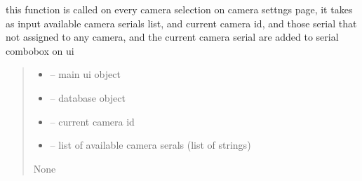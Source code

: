 \documentclass[letterpaper,10pt,english]{sphinxmanual}
\begin{document}

\begin{savenotes}\begin{fulllineitems}
\label{\detokenize{setting/backend/camera_funcs:oxin.backend.camera_funcs.assign_existing_serials_to_ui}}
\pysigstartsignatures
{}
\pysigstopsignatures
\sphinxAtStartPar
this function is called on every camera selection on camera settngs page,
it takes as input available camera serials list, and current camera id, and those serial that not assigned to any camera, and the current camera serial
are added to serial combobox on ui
\begin{quote}\begin{description}
\begin{itemize}
\item {} 
\sphinxAtStartPar
{} – main ui object

\item {} 
\sphinxAtStartPar
{} – database object

\item {} 
\sphinxAtStartPar
{} – current camera id

\item {} 
\sphinxAtStartPar
{} – list of available camera serals (list of strings)

\end{itemize}

\sphinxAtStartPar
None

\end{description}\end{quote}

\end{fulllineitems}\end{savenotes}

\end{document}
